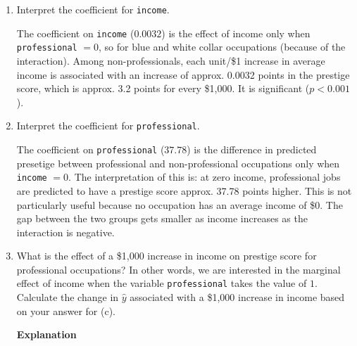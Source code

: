 \documentclass[12pt,letterpaper]{article}
\begin{document}
\begin{enumerate}
	\vspace{.5cm}

	\textbf{Code}
	
	\vspace{.5cm}
	\textbf{Output}
	\begin{verbatim}
        (Intercept)              income        professional
        (Intercept)              income        professional income:professional 
       21.142258854         0.003170909        37.781279955        -0.002325709 
	\end{verbatim}
	
\newpage
	\item [(d)]
	Interpret the coefficient for \texttt{income}.
	\vspace{.5cm}

	The coefficient on \texttt{income} ($0.0032$) is the effect of income only when \texttt{professional} $= 0$, so for blue and white collar occupations (because of the interaction). Among non-professionals, each unit/\$1 increase in average income is associated with an increase of approx. 0.0032 points in the prestige score, which is approx. 3.2 points for every \$1,000. It is significant ($p < 0.001$).

	\vspace{5cm}	
	\item [(e)]
	Interpret the coefficient for \texttt{professional}.
	\vspace{.5cm}

	The coefficient on \texttt{professional} ($37.78$) is the difference in predicted presetige between professional and non-professional occupations only when \texttt{income} $= 0$. The interpretation of this is: at zero income, professional jobs are predicted to have a prestige score approx. 37.78 points higher. This is not particularly useful because no occupation has an average income of \$0. The gap between the two groups gets smaller as income increases as the interaction is negative.
	
	\newpage
	\item [(f)]
	What is the effect of a \$1,000 increase in income on prestige score for professional occupations? In other words, we are interested in the marginal effect of income when the variable \texttt{professional} takes the value of $1$. Calculate the change in $\hat{y}$ associated with a \$1,000 increase in income based on your answer for (c).
	\vspace{.5cm}

	\textbf{Explanation}
	\vspace{.5cm}


\end{enumerate}
\end{document}
